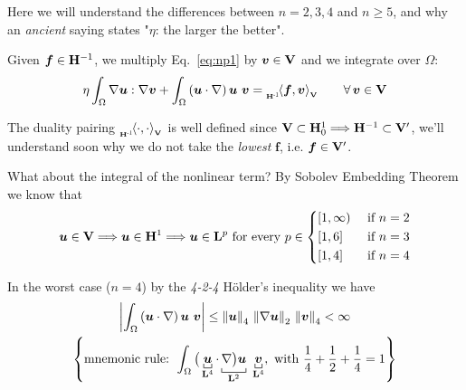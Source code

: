 {\color{purple} Here we will understand the differences between $n=2,3,4$ and $n\geq 5$,} {\color{forestgreen(web)} and why an \emph{ancient} saying states "$\eta$: the larger the better".}

\noindent\rlap{\rule[1.5ex]{0.495\textwidth}{.2pt}}\vspace{-0.3em}


Given $\bm f\in\mathbf{H}^{-1}$, we multiply Eq.~\eqref{eq:np1} by $\bm v \in \mathbf{V}$ and we integrate over $\Omega$:
\begin{equation*}
 \eta\int_\Omega \nabla \bm u : \nabla \bm v+\int_\Omega \left( \bm u\cdot\nabla \right) \bm u\ \bm v=\dualV{\bm f,\bm v}{\Hv}{-1} \qquad \forall\, \bm v\in\Vv
\end{equation*}

The duality pairing $\dualV{\cdot,\cdot}{\Hv}{-1}$ is well defined since $\mathbf{V}\subset\mathbf{H}_0^1\Longrightarrow\mathbf{H}^{-1}\subset \mathbf{V}'$, {\color{blue}we'll understand soon why we do not take the \emph{lowest} $\bm f$, i.e. $\bm f \in \mathbf{V}'$.}

\smallskip

What about the integral of the nonlinear term? By Sobolev Embedding Theorem we know that
\begin{equation}
\label{Sob-Emb}
\bm u\in \mathbf{V}\Longrightarrow \bm u\in \mathbf{H}^1 \Longrightarrow \bm u\in \mathbf{L}^p\text{ for every }p\in \left\{
\begin{aligned}
&[1,\infty) &&\text{ if }n=2 \\
&[1,6] &&\text{ if }n=3 \\
&[1,4] &&\text{ if }n=4 \\
\end{aligned} \right.
\end{equation}

In the worst case ($n=4$) by the \textit{4-2-4} Hölder's inequality we have
\begin{equation*}
\begin{gathered}
\left| \int_\Omega \left( \bm u\cdot\nabla \right) \bm u\ \bm v \right| \leq \norm{\bm u}_4\,\norm{\nabla\bm u}_2\,\norm{\bm v}_4<\infty \\
\left\{ \text{mnemonic rule: } \int_\Omega \big( \underbracket[0.5pt]{\bm u}_{\Lv^4}\cdot \underbracket[0.5pt]{\nabla \big) \bm u}_{\Lv^2}\ \underbracket[0.5pt]{\bm v }_{\Lv^4},\ \text{with }\frac{1}{4}+\frac{1}{2}+\frac{1}{4}=1  \right\}  
\end{gathered}
\end{equation*}

